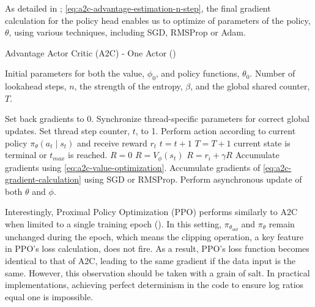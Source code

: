 \noindent As detailed in \textcolor{deepblue}{\cite{mnih2016asynchronous}; \autoref{eq:a2c-advantage-estimation-n-step}}, the final gradient calculation for the policy head enables us to optimize of parameters of the policy, $\theta$, using various techniques, including SGD, RMSProp or Adam.

\begin{algorithm}[htbp]
\caption{Advantage Actor Critic (A2C) - One Actor (\cite{mnih2016asynchronous})} 
\label{alg:A2C}

\begin{algorithmic}[1]
\State {} Initial parameters for both the value, $\phi_0$, and policy functions, $\theta_0$.
\State {} Number of lookahead steps, $n$, the strength of the entropy, $\beta$, and the global shared counter, $T$.

\Repeat
    \State Set back gradients to 0.
    \State Synchronize thread-specific parameters for correct global updates.
    \State Set thread step counter, $t$, to 1.
    \Repeat
        \State Perform action according to current policy $\pi_{\theta}(a_t \mid s_t)$ and receive reward $r_t$
        \State $t = t + 1$
        \State $T = T + 1$
    \Until current state is terminal or $t_{max}$ is reached.
        \State $R = 0$
    \Else
        \State $R = V_{\phi}(s_t)$
    \EndIf
        \State $R = r_i + \gamma R$
        \State Accumulate gradients using \textcolor{deepblue}{\autoref{eq:a2c-value-optimization}}.
        \State Accumulate gradients of \textcolor{deepblue}{\autoref{eq:a2c-gradient-calculation}} using SGD or RMSProp.
    \EndFor
    \State Perform asynchronous update of both $\theta$ and $\phi$.
\end{algorithmic}
\end{algorithm}

\bigskip

\noindent 
Interestingly, Proximal Policy Optimization (PPO) performs similarly to A2C when limited to a single training epoch (\textcolor{deepblue}{\cite{huang2022a2c}}). In this setting, $\pi_{\theta_{old}}$ and $\pi_{\theta}$ remain unchanged during the epoch, which means the clipping operation, a key feature in PPO's loss calculation, does not fire. As a result, PPO's loss function becomes identical to that of A2C, leading to the same gradient if the data input is the same. 
However, this observation should be taken with a grain of salt. In practical implementations, achieving perfect determinism in the code to ensure log ratios equal one is impossible.


